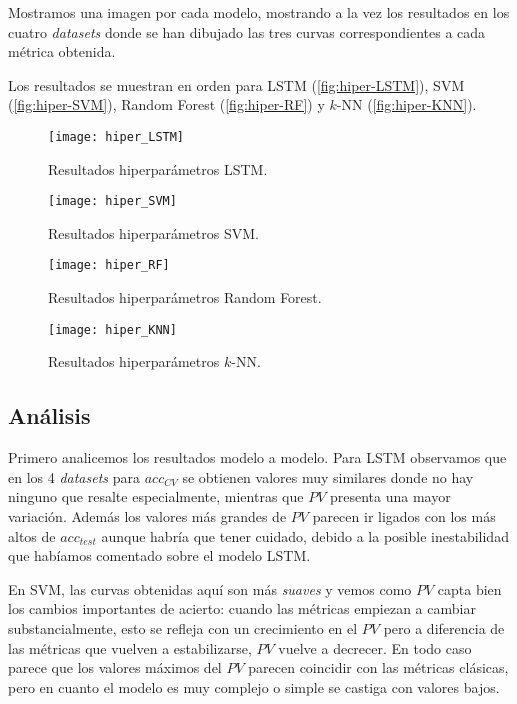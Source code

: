 Mostramos una imagen por cada modelo, mostrando a la vez los resultados en los cuatro \emph{datasets} donde se han dibujado las tres curvas correspondientes a cada métrica obtenida.

Los resultados se muestran en orden para LSTM (\autoref{fig:hiper-LSTM}), SVM (\autoref{fig:hiper-SVM}), Random Forest (\autoref{fig:hiper-RF}) y $k$-NN (\autoref{fig:hiper-KNN}).

\begin{figure}[htbp]
  \centering
  \hspace*{-1.5cm}
  \texttt{[image: hiper\_LSTM]}
  \caption{Resultados hiperparámetros LSTM.}
  \label{fig:hiper-LSTM}
\end{figure}

\begin{figure}[htbp]
  \centering
  \hspace*{-1cm}
  \texttt{[image: hiper\_SVM]}
  \caption{Resultados hiperparámetros SVM.}
  \label{fig:hiper-SVM}
\end{figure}

\begin{figure}[htbp]
  \centering
  \hspace*{-1.5cm}
  \texttt{[image: hiper\_RF]}
  \caption{Resultados hiperparámetros Random Forest.}
  \label{fig:hiper-RF}
\end{figure}

\begin{figure}[htbp]
  \centering
  \hspace*{-1cm}
  \texttt{[image: hiper\_KNN]}
  \caption{Resultados hiperparámetros $k$-NN.}
  \label{fig:hiper-KNN}
\end{figure}

\subsection{Análisis}

Primero analicemos los resultados modelo a modelo. Para LSTM observamos que en los 4 \emph{datasets} para $acc_{CV}$ se obtienen valores muy similares donde no hay ninguno que resalte especialmente, mientras que $PV$ presenta una mayor variación. Además los valores más grandes de $PV$ parecen ir ligados con los más altos de $acc_{test}$ aunque habría que tener cuidado, debido a la posible inestabilidad que habíamos comentado sobre el modelo LSTM.

En SVM, las curvas obtenidas aquí son más \emph{suaves} y vemos como $PV$ capta bien los cambios importantes de acierto: cuando las métricas empiezan a cambiar substancialmente, esto se refleja con un crecimiento en el $PV$ pero a diferencia de las métricas que vuelven a estabilizarse, $PV$ vuelve a decrecer. En todo caso parece que los valores máximos del $PV$ parecen coincidir con las métricas clásicas, pero en cuanto el modelo es muy complejo o simple se castiga con valores bajos.

